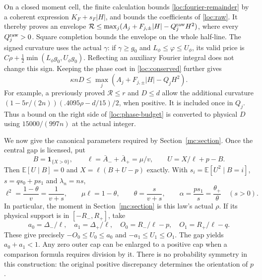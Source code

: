 \documentclass[aop,preprint]{imsart}
\theoremstyle{definition}
\newcommand{\E}{\mathbb E}
\numberwithin{equation}{section}
\begin{document}
On a closed moment cell, the finite calculation bounds
\eqref{loc:fourier-remainder} by a coherent expression
$K_F+s_F|H|$, and bounds the coefficients of \eqref{loc:raw}.
It thereby proves an envelope
$\mathcal R\le\max_j(A_j+F_{j,\pm}|H|-Q_j^{\rm raw}H^2)$,
where every $Q_j^{\rm raw}>0$.
Square completion bounds the envelope on the whole half-line.
The signed curvature uses the actual $\gamma$: if
$\gamma\ge g_0$ and $L_\phi\le\varphi\le U_\phi$, its valid price is
$C\rho+\tfrac12\min(L_\phi g_0,U_\phi g_0)$.
Reflecting an auxiliary Fourier integral does not change this sign.
Keeping the phase cost in \eqref{loc:conserved} further gives
\begin{equation}\label{loc:phase-budget}
 \kappa nD\le\max_j(A_j+F_{j,\pm}|H|-Q_jH^2).
\end{equation}
For example, a previously proved $\mathcal R\le r$ and $D\le d$
allow the additional curvature
$(1-5r/(2n))( .4095\rho-d/15)/2$, when positive.
It is included once in $Q_j$.
Thus a bound on the right side of \eqref{loc:phase-budget} is converted
to physical $D$ using $15000/(997n)$ at the actual integer.

We now give the canonical parameters required by
Section~\ref{mc:section}. Once the central gap is licensed, put
\begin{equation}\label{loc:canonical}
 B=\mathbf1_{\{X>0\}},\qquad
 \ell=\bar A_-+\bar A_+=\mu/v,\qquad
 U=X/\ell+p-B.
\end{equation}
Then $\E[U\mid B]=0$ and $X=\ell(B+U-p)$ exactly.
With $s_i=\E[U^2\mid B=i]$, $s=qs_0+ps_1$ and $\lambda_n=ns$,
\begin{equation}\label{loc:canonical-identities}
 \ell^2=\frac{1-\theta}{v}=\frac1{v+s},\qquad
 \mu\ell=1-\theta,\qquad
 \theta=\frac{s}{v+s},\qquad
 \alpha=\frac{ps_1}{s}=\frac{\theta_+}{\theta}\quad(s>0).
\end{equation}
In particular, the moment in Section~\ref{mc:section} is this law's
actual $\rho$. If its physical support is in $[-R_-,R_+]$, take
\begin{equation}\label{loc:conditional-support}
 a_0=\Delta_-/\ell,\quad a_1=\Delta_+/\ell,\quad
 O_0=R_-/\ell-p,\quad O_1=R_+/\ell-q.
\end{equation}
These give precisely $-O_0\le U_0\le a_0$ and
$-a_1\le U_1\le O_1$. The gap yields $a_0+a_1<1$.
Any zero outer cap can be enlarged to a positive cap when a comparison
formula requires division by it.
There is no probability symmetry in this construction: the original
positive discrepancy determines the orientation of $p$.
\end{document}
